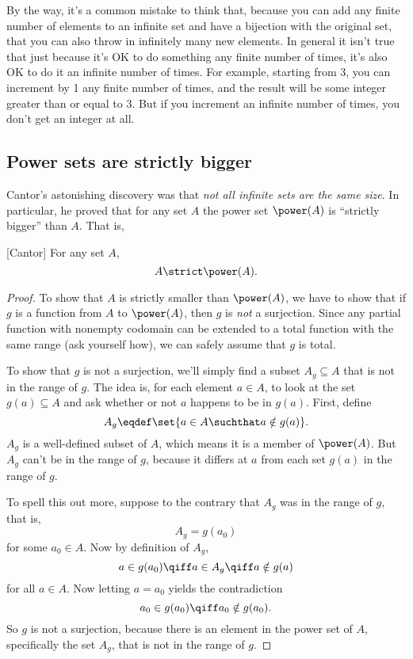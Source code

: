 By the way, it's a common mistake to think that, because you can add
any finite number of elements to an infinite set and have a bijection
with the original set, that you can also throw in infinitely many new
elements.  In general it isn't true that just because it's OK to do
something any finite number of times, it's also OK to do it an infinite
number of times.  For example, starting from 3, you can increment by 1
any finite number of times, and the result will be some integer
greater than or equal to 3.  But if you increment an infinite number
of times, you don't get an integer at all.

\subsection{Power sets are strictly bigger}

Cantor's astonishing discovery was that \emph{not all infinite sets
  are the same size}.  In particular, he proved that for any set $A$
the power set $\power(A)$ is ``strictly bigger'' than
$A$.  That is,
\begin{theorem}\label{powbig}[Cantor]\mbox{}
For any set $A$,
\[
A \strict \power(A).
\]
\end{theorem}
\begin{proof}
\iffalse
  First of all, $\power(A)$ is as big as $A$: for example, the partial
  function $f:\power(A) \to A$, where $f(\set{a}) \eqdef a$ for $a \in
  A$ and $f$ is only defined on one-element sets, is a surjection.
\fi
 
To show that $A$ is strictly smaller than $\power(A)$, we have to show
that if $g$ is a function from $A$ to $\power(A)$, then $g$ is
\emph{not} a surjection.  Since any partial function with nonempty
codomain can be extended to a total function with the same range (ask
yourself how), we can safely assume that $g$ is total.

To show that $g$ is not a surjection, we'll simply find a subset $A_g
\subseteq A$ that is not in the range of $g$.  The idea is, for each
element $a \in A$, to look at the set $g(a) \subseteq A$ and ask
whether or not $a$ happens to be in $g(a)$.  First, define \iffalse
mimicking Russell's Paradox,\fi
  \[
  A_g \eqdef \set{a \in A \suchthat a \notin g(a)}.
  \]
  $A_g$ is a well-defined subset of $A$, which means it is a
  member of $\power(A)$.  But $A_g$ can't be in the range of $g$,
  because it differs at $a$ from each set $g(a)$ in the range of $g$.

  To spell this out more, suppose to the contrary that $A_g$ was in
  the range of $g$, that is,
\[
A_g = g(a_0)
\]
for some $a_0 \in A$.  Now by definition of $A_g$,
\[
a \in g(a_0) \qiff a \in A_g \qiff a \notin g(a)
\]
for all $a \in A$.  Now letting $a = a_0$ yields the contradiction
\[
a_0 \in g(a_0) \qiff a_0 \notin g(a_0).
\]
So $g$ is not a surjection, because there is an element in the power
set of $A$, specifically the set $A_g$, that is not in the range of $g$.
\end{proof}

